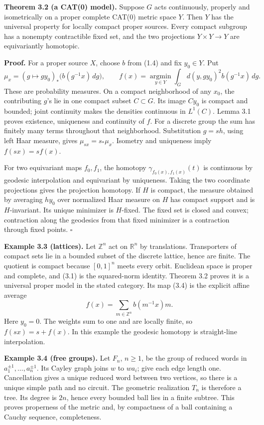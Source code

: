\documentclass[
  11pt,
]{article}
\begin{document}
\textbf{Theorem 3.2 (a CAT(0) model).} Suppose \(G\) acts continuously,
properly and isometrically on a proper complete CAT(0) metric space
\(Y\). Then \(Y\) has the universal property for locally compact proper
sources. Every compact subgroup has a nonempty contractible fixed set,
and the two projections \(Y\times Y\to Y\) are equivariantly homotopic.

\textbf{Proof.} For a proper source \(X\), choose \(b\) from (1.4) and
fix \(y_0\in Y\). Put \[
 \mu_x=(g\mapsto gy_0)_*\bigl(b(g^{-1}x)\,dg\bigr),
 \qquad f(x)=\operatorname*{argmin}_{y\in Y}
                 \int_Gd(y,gy_0)^2b(g^{-1}x)\,dg.
 \tag{3.4}
\] These are probability measures. On a compact neighborhood of any
\(x_0\), the contributing \(g\)'s lie in one compact subset
\(C\subset G\). Its image \(Cy_0\) is compact and bounded; joint
continuity makes the densities continuous in \(L^1(C)\). Lemma 3.1
proves existence, uniqueness and continuity of \(f\). For a discrete
group the sum has finitely many terms throughout that neighborhood.
Substitution \(g=sh\), using left Haar measure, gives
\(\mu_{sx}=s_*\mu_x\). Isometry and uniqueness imply \(f(sx)=sf(x)\).

For two equivariant maps \(f_0,f_1\), the homotopy
\(\gamma_{f_0(x),f_1(x)}(t)\) is continuous by geodesic interpolation
and equivariant by uniqueness. Taking the two coordinate projections
gives the projection homotopy. If \(H\) is compact, the measure obtained
by averaging \(hy_0\) over normalized Haar measure on \(H\) has compact
support and is \(H\)-invariant. Its unique minimizer is \(H\)-fixed. The
fixed set is closed and convex; contraction along the geodesics from
that fixed minimizer is a contraction through fixed points. \(\square\)

\textbf{Example 3.3 (lattices).} Let \(\mathbb Z^n\) act on
\(\mathbb R^n\) by translations. Transporters of compact sets lie in a
bounded subset of the discrete lattice, hence are finite. The quotient
is compact because \([0,1]^n\) meets every orbit. Euclidean space is
proper and complete, and (3.1) is the squared-norm identity. Theorem 3.2
proves it is a universal proper model in the stated category. Its map
(3.4) is the explicit affine average \[
                   f(x)=\sum_{m\in\mathbb Z^n}b(m^{-1}x)m.
 \tag{3.5}
\] Here \(y_0=0\). The weights sum to one and are locally finite, so
\(f(sx)=s+f(x)\). In this example the geodesic homotopy is straight-line
interpolation.

\textbf{Example 3.4 (free groups).} Let \(F_n\), \(n\ge1\), be the group
of reduced words in \(a_1^{\pm1},\ldots,a_n^{\pm1}\). Its Cayley graph
joins \(w\) to \(wa_i\); give each edge length one. Cancellation gives a
unique reduced word between two vertices, so there is a unique simple
path and no circuit. The geometric realization \(T_n\) is therefore a
tree. Its degree is \(2n\), hence every bounded ball lies in a finite
subtree. This proves properness of the metric and, by compactness of a
ball containing a Cauchy sequence, completeness.
\end{document}
